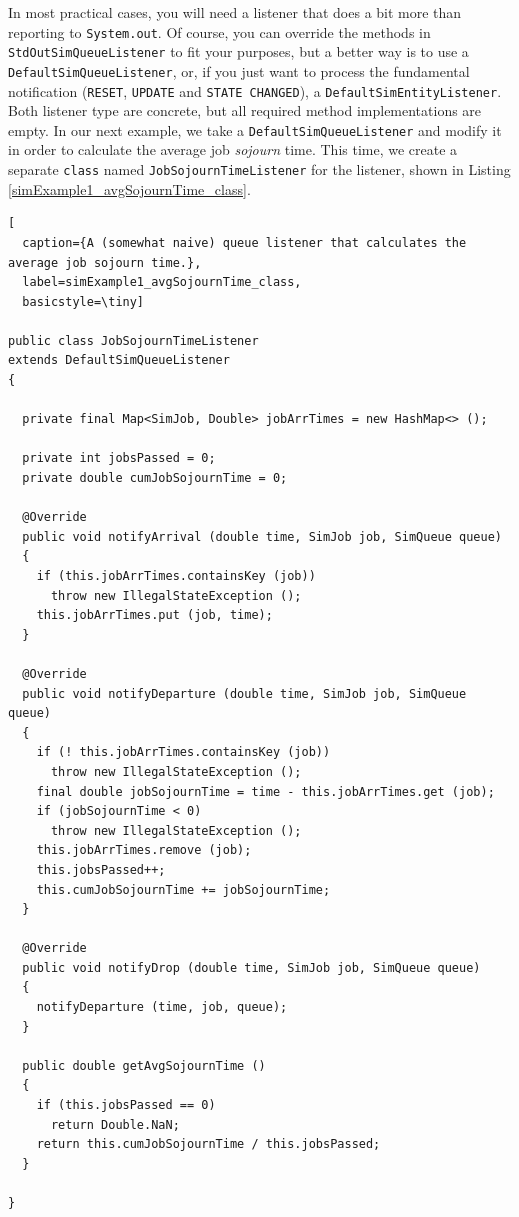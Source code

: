 \documentclass[12pt]{book}
\begin{document}
In most practical cases,
  you will need a listener that does a bit more than reporting to \lstinline|System.out|.
Of course, you can override the methods in \lstinline|StdOutSimQueueListener|
  to fit your purposes, but a better way is to use a \lstinline|DefaultSimQueueListener|,
  or, if you just want to process the fundamental notification (\lstinline|RESET|,
  \lstinline|UPDATE| and \lstinline|STATE CHANGED|),
  a \lstinline|DefaultSimEntityListener|.
Both listener type are concrete,
  but all required method implementations are empty.
In our next example,
  we take a \lstinline|DefaultSimQueueListener|
  and modify it in order to calculate the average
  job {\em sojourn\/} time.
This time,
  we create a separate \lstinline|class| named \lstinline|JobSojournTimeListener|
  for the listener,
  shown in Listing \ref{simExample1_avgSojournTime_class}.

\begin{lstfloat}
\begin{lstlisting}[
  caption={A (somewhat naive) queue listener that calculates the average job sojourn time.},
  label=simExample1_avgSojournTime_class,
  basicstyle=\tiny]

public class JobSojournTimeListener
extends DefaultSimQueueListener
{

  private final Map<SimJob, Double> jobArrTimes = new HashMap<> ();

  private int jobsPassed = 0;
  private double cumJobSojournTime = 0;
  
  @Override
  public void notifyArrival (double time, SimJob job, SimQueue queue)
  {
    if (this.jobArrTimes.containsKey (job))
      throw new IllegalStateException ();
    this.jobArrTimes.put (job, time);
  }
  
  @Override
  public void notifyDeparture (double time, SimJob job, SimQueue queue)
  {
    if (! this.jobArrTimes.containsKey (job))
      throw new IllegalStateException ();
    final double jobSojournTime = time - this.jobArrTimes.get (job);
    if (jobSojournTime < 0)
      throw new IllegalStateException ();
    this.jobArrTimes.remove (job);
    this.jobsPassed++;
    this.cumJobSojournTime += jobSojournTime;
  }

  @Override
  public void notifyDrop (double time, SimJob job, SimQueue queue)
  {
    notifyDeparture (time, job, queue);
  }
  
  public double getAvgSojournTime ()
  {
    if (this.jobsPassed == 0)
      return Double.NaN;
    return this.cumJobSojournTime / this.jobsPassed;
  }
  
}

\end{lstlisting}
\end{lstfloat}
\end{document}
